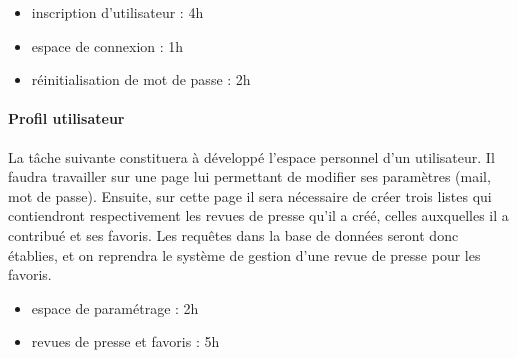 			\begin{itemize}
				\item inscription d'utilisateur : 4h
				\item espace de connexion : 1h
				\item réinitialisation de mot de passe : 2h
			\end{itemize}

		\paragraph{Profil utilisateur}
			La tâche suivante constituera à développé l'espace personnel d'un utilisateur. Il faudra travailler sur une page lui permettant de modifier ses paramètres (mail, mot de passe). Ensuite, sur cette page il sera nécessaire de créer trois listes qui contiendront respectivement les revues de presse qu'il a créé, celles auxquelles il a contribué et ses favoris. Les requêtes dans la base de données seront donc établies, et on reprendra le système de gestion d'une revue de presse pour les favoris.

			\begin{itemize}
				\item espace de paramétrage : 2h
				\item revues de presse et favoris : 5h
			\end{itemize}